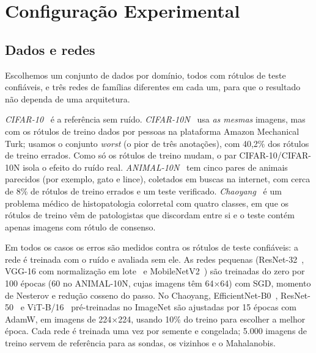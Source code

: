 \section{Configuração Experimental}

\subsection{Dados e redes}
Escolhemos um conjunto de dados por domínio, todos com rótulos de teste confiáveis, e três redes de famílias diferentes em cada um,
para que o resultado não dependa de uma arquitetura.

\emph{CIFAR-10}~\cite{krizhevsky2009} é a referência sem ruído. \emph{CIFAR-10N}~\cite{wei2022} usa \emph{as mesmas} imagens, mas com os
rótulos de treino dados por pessoas na plataforma Amazon Mechanical Turk; usamos o conjunto \textit{worst} (o pior de três anotações),
com 40,2\% dos rótulos de treino errados. Como só os rótulos de treino mudam, o par CIFAR-10/CIFAR-10N isola o efeito do ruído real.
\emph{ANIMAL-10N}~\cite{song2019} tem cinco pares de animais parecidos (por exemplo, gato e lince), coletados em buscas na internet, com
cerca de 8\% de rótulos de treino errados e um teste verificado. \emph{Chaoyang}~\cite{zhu2022} é um problema médico de histopatologia
colorretal com quatro classes, em que os rótulos de treino vêm de patologistas que discordam entre si e o teste contém apenas imagens com
rótulo de consenso. %

Em todos os casos os erros são medidos contra os rótulos de teste confiáveis: a rede é treinada com o ruído e avaliada sem ele. As redes
pequenas (ResNet-32~\cite{he2016}, VGG-16 com normalização em lote~\cite{simonyan2015} e MobileNetV2~\cite{sandler2018}) são treinadas do
zero por 100 épocas (60 no ANIMAL-10N, cujas imagens têm 64$\times$64) com SGD, momento de Nesterov e redução cosseno do passo. No
Chaoyang, EfficientNet-B0~\cite{tan2019}, ResNet-50~\cite{he2016} e ViT-B/16~\cite{dosovitskiy2021} pré-treinadas no ImageNet são
ajustadas por 15 épocas com AdamW, em imagens de 224$\times$224, usando 10\% do treino para escolher a melhor época. Cada rede é treinada
uma vez por semente e congelada; 5.000 imagens de treino servem de referência para as sondas, os vizinhos e o Mahalanobis.

